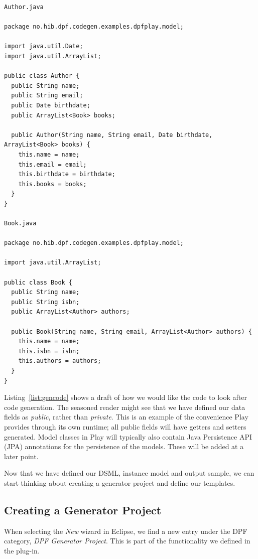 \lstset{language=Java,caption=Listing shows a preliminary draft of the code we want to generate.,label=list:gencode,captionpos=b}
\begin{table}[hp]
  \centering
\begin{lstlisting}[showstringspaces=false]
Author.java

package no.hib.dpf.codegen.examples.dpfplay.model;

import java.util.Date;
import java.util.ArrayList;

public class Author {
  public String name;
  public String email;
  public Date birthdate;
  public ArrayList<Book> books;

  public Author(String name, String email, Date birthdate, ArrayList<Book> books) {
    this.name = name;
    this.email = email;
    this.birthdate = birthdate;
    this.books = books;
  }
}

Book.java

package no.hib.dpf.codegen.examples.dpfplay.model;

import java.util.ArrayList;

public class Book {
  public String name;
  public String isbn;
  public ArrayList<Author> authors;

  public Book(String name, String email, ArrayList<Author> authors) {
    this.name = name;
    this.isbn = isbn;
    this.authors = authors;
  }
}
\end{lstlisting}
\end{table}

Listing~\ref{list:gencode} shows a draft of how we would like the code to look after code generation. The seasoned reader might see that we have defined our data fields as \emph{public}, rather than \emph{private}. This is an example of the convenience Play provides through its own runtime; all public fields will have getters and setters generated. Model classes in Play will typically also contain Java Persistence API (JPA) annotations for the persistence of the models. These will be added at a later point.

Now that we have defined our DSML, instance model and output sample, we can start thinking about creating a generator project and define our templates.

\subsection{Creating a Generator Project}
When selecting the \emph{New} wizard in Eclipse, we find a new entry under the DPF category, \emph{DPF Generator Project}. This is part of the functionality we defined in the  plug-in.

